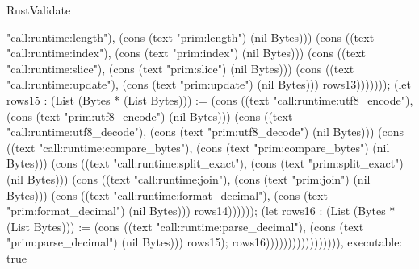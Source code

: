 \begin{lexlean}{RustValidate}
\begin{semanticmodule}
{"call:runtime:length"), (cons (text "prim:length") (nil Bytes))) (cons ((text "call:runtime:index"), (cons (text "prim:index") (nil Bytes))) (cons ((text "call:runtime:slice"), (cons (text "prim:slice") (nil Bytes))) (cons ((text "call:runtime:update"), (cons (text "prim:update") (nil Bytes))) rows13))))))); (let rows15 : (List (Bytes * (List Bytes))) := (cons ((text "call:runtime:utf8_encode"), (cons (text "prim:utf8_encode") (nil Bytes))) (cons ((text "call:runtime:utf8_decode"), (cons (text "prim:utf8_decode") (nil Bytes))) (cons ((text "call:runtime:compare_bytes"), (cons (text "prim:compare_bytes") (nil Bytes))) (cons ((text "call:runtime:split_exact"), (cons (text "prim:split_exact") (nil Bytes))) (cons ((text "call:runtime:join"), (cons (text "prim:join") (nil Bytes))) (cons ((text "call:runtime:format_decimal"), (cons (text "prim:format_decimal") (nil Bytes))) rows14)))))); (let rows16 : (List (Bytes * (List Bytes))) := (cons ((text "call:runtime:parse_decimal"), (cons (text "prim:parse_decimal") (nil Bytes))) rows15); rows16))))))))))))))))),
  executable: true
}


\end{semanticmodule}
\end{lexlean}
